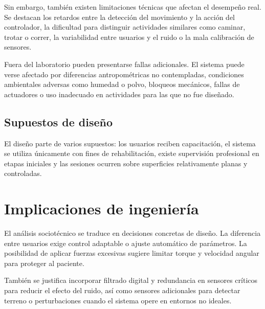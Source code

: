 \documentclass[letterpaper,12pt]{article}
\begin{document}
Sin embargo, también existen limitaciones técnicas que afectan el desempeño real. Se destacan los retardos entre la detección del movimiento y la acción del controlador, la dificultad para distinguir actividades similares como caminar, trotar o correr, la variabilidad entre usuarios y el ruido o la mala calibración de sensores.

Fuera del laboratorio pueden presentarse fallas adicionales. El sistema puede verse afectado por diferencias antropométricas no contempladas, condiciones ambientales adversas como humedad o polvo, bloqueos mecánicos, fallas de actuadores o uso inadecuado en actividades para las que no fue diseñado.

\subsection*{Supuestos de diseño}

El diseño parte de varios supuestos: los usuarios reciben capacitación, el sistema se utiliza únicamente con fines de rehabilitación, existe supervisión profesional en etapas iniciales y las sesiones ocurren sobre superficies relativamente planas y controladas.

\section{Implicaciones de ingeniería}

El análisis sociotécnico se traduce en decisiones concretas de diseño. La diferencia entre usuarios exige control adaptable o ajuste automático de parámetros. La posibilidad de aplicar fuerzas excesivas sugiere limitar torque y velocidad angular para proteger al paciente.

También se justifica incorporar filtrado digital y redundancia en sensores críticos para reducir el efecto del ruido, así como sensores adicionales para detectar terreno o perturbaciones cuando el sistema opere en entornos no ideales.
\end{document}
